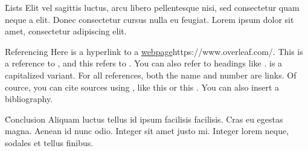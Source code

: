 \documentclass[twocolumn]{paper}
\begin{document}
\h{Lists}
Elit vel sagittis luctus, arcu libero pellentesque nisi, sed consectetur quam neque a elit. Donec consectetur cursus nulla eu feugiat. Lorem ipsum dolor sit amet, consectetur adipiscing elit.


\h{Referencing}
Here is a hyperlink to a \url{webpage}{https://www.overleaf.com/}. This is a reference to , and this refers to . You can also refer to headings like .  is a capitalized variant. For all references, both the name and number are links. Of cource, you can cite sources using \c{\cite{...}}, like this \cite{minted} or this \cite{tabularray}. You can also insert a bibliography.

\h{Conclusion}
Aliquam luctus tellus id ipsum facilisis facilisis. Cras eu egestas magna. Aenean id nunc odio. Integer sit amet justo mi. Integer lorem neque, sodales et tellus finibus.

\toc

\end{document}
